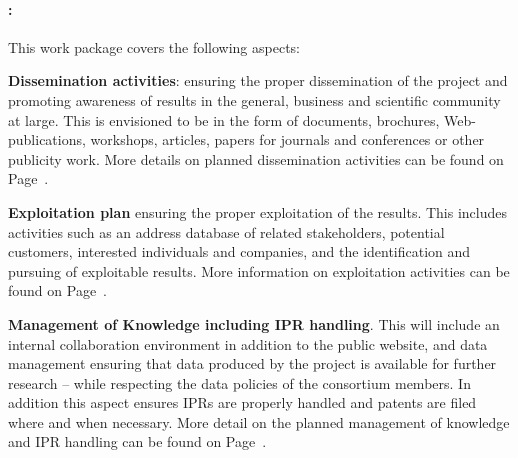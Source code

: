 \paragraph{\textbf{\WPInnovation:  \WPInnovationTitle}}
This work package covers the following aspects:
\begin{denseItemize}
\item \textbf{Dissemination activities}: ensuring the proper dissemination of the \Project{} project and promoting awareness of results in the general, business and scientific community at large. This is envisioned to be in the form of documents, brochures, Web-publications, workshops, articles, papers for journals and conferences or other publicity work. More details on planned dissemination activities can be found on Page~\pageref{sec:diss}.
\item \textbf{Exploitation plan} ensuring the proper exploitation of the \Project{} results. This includes activities such as an address database of related stakeholders, potential customers, interested individuals and companies, and the identification and pursuing of exploitable results. More information on exploitation activities can be found on Page~\pageref{sec:expl}.
\item \textbf{Management of Knowledge including IPR handling}. This will include an internal collaboration environment in addition to the public website, and data management ensuring that data produced by the project is available for further research -- while respecting the data policies of the consortium members. In addition this aspect ensures IPRs are properly handled and patents are filed where and when necessary. More detail on the planned management of knowledge and IPR handling can be found on Page~\pageref{sec:iprhandling}.
\end{denseItemize}


